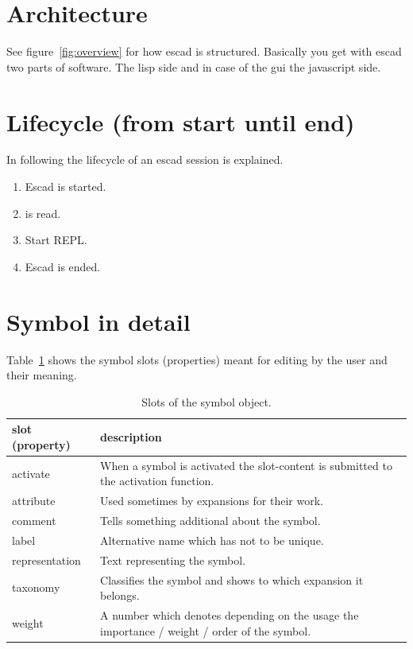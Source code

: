 \documentclass[a4paper, 12pt, openany]{scrbook}
\begin{document}
\section{Architecture}
See figure~\ref{fig:overview} for how escad is structured. Basically you get with escad two parts of software. The lisp side and in case of the gui the javascript side.
\section{Lifecycle (from start until end)}
In following the lifecycle of an escad session is explained.
\begin{enumerate}
\item Escad is started.
\item {} is read.
\item Start REPL.
\item Escad is ended.
\end{enumerate}
\section{Symbol in detail}
Table~\ref{tab:symbol} shows the symbol slots (properties) meant for editing by the user and their meaning.
\begin{table}[htbp]
\centering
\begin{tabular}{|p{2.5cm}|p{13cm}|}
  \hline
  \textbf{slot (property)} & \textbf{description} \\
  \hline
  activate & When a symbol is activated the slot-content is submitted to the activation function. \\
  \hline
  attribute & Used sometimes by expansions for their work. \\
  \hline
  comment & Tells something additional about the symbol. \\
  \hline
  label & Alternative name which has not to be unique. \\
  \hline
  representation & Text representing the symbol. \\
  \hline
  taxonomy & Classifies the symbol and shows to which expansion it belongs. \\
  \hline
  weight & A number which denotes depending on the usage the importance / weight / order of the symbol. \\
  \hline
\end{tabular}
\caption{Slots of the symbol object.}
\label{tab:symbol}
\end{table}
\end{document}
